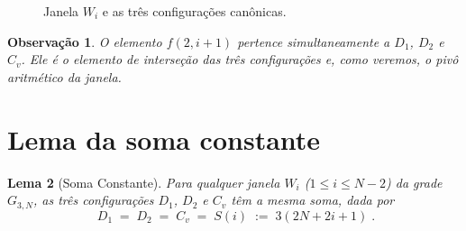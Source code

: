 \documentclass[12pt, a4paper]{article}
\newtheorem{lema}{Lema}[section]
\newtheorem{observacao}[lema]{Observação}
\begin{document}
	\begin{figure}[h]
		\centering
		\caption{Janela $W_i$ e as três configurações canônicas.}
		\label{fig:janela}
	\end{figure}
	
	\begin{observacao}
		O elemento $f(2,i+1)$ pertence simultaneamente a $D_1$, $D_2$ e $C_v$.
		Ele é o \textit{elemento de interseção} das três configurações e,
		como veremos, o pivô aritmético da janela.
	\end{observacao}
	
	\section{Lema da soma constante}
	\label{sec:lema}
	
	\begin{lema}[Soma Constante]
		\label{lema:soma}
		Para qualquer janela $W_i$ ($1\le i\le N-2$) da grade $G_{3,N}$, as três
		configurações $D_1$, $D_2$ e $C_v$ têm a mesma soma, dada por
		\[
		\boxed{\;D_1 \;=\; D_2 \;=\; C_v \;=\; S(i) \;:=\; 3(2N+2i+1)\;}.
		\]
	\end{lema}
	
\end{document}
